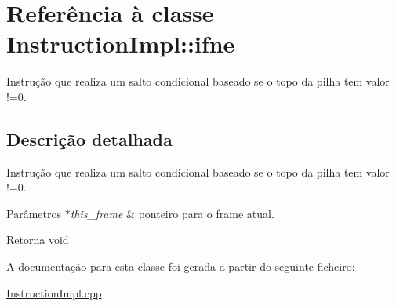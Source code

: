 \hypertarget{class_instruction_impl_1_1ifne}{}\section{Referência à classe Instruction\+Impl\+:\+:ifne}
\label{class_instruction_impl_1_1ifne}


Instrução que realiza um salto condicional baseado se o topo da pilha tem valor !=0.  




\subsection{Descrição detalhada}
Instrução que realiza um salto condicional baseado se o topo da pilha tem valor !=0. 


\begin{DoxyParams}{Parâmetros}
{\em $\ast$this\+\_\+frame} & ponteiro para o frame atual. \\
\hline
\end{DoxyParams}
\begin{DoxyReturn}{Retorna}
void 
\end{DoxyReturn}


A documentação para esta classe foi gerada a partir do seguinte ficheiro\+:\begin{DoxyCompactItemize}
\item 
\hyperlink{_instruction_impl_8cpp}{Instruction\+Impl.\+cpp}\end{DoxyCompactItemize}
